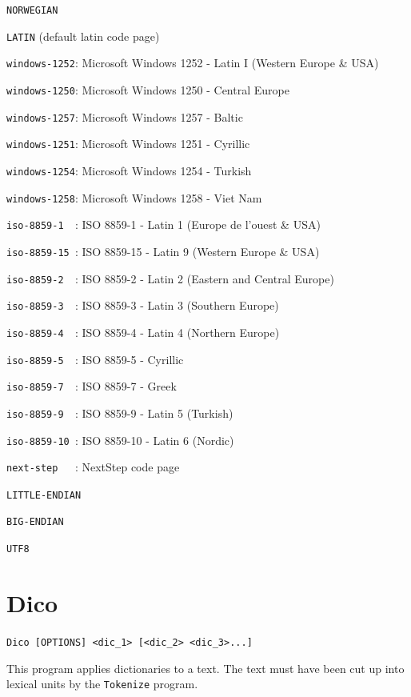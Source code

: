 \verb$NORWEGIAN$

\verb$LATIN$ (default latin code page)

\verb$windows-1252$: Microsoft Windows 1252 - Latin I (Western Europe \& USA)

\verb$windows-1250$: Microsoft Windows 1250 - Central Europe

\verb$windows-1257$: Microsoft Windows 1257 - Baltic

\verb$windows-1251$: Microsoft Windows 1251 - Cyrillic

\verb$windows-1254$: Microsoft Windows 1254 - Turkish

\verb$windows-1258$: Microsoft Windows 1258 - Viet Nam

\verb$iso-8859-1  $: ISO 8859-1  - Latin 1 (Europe de l'ouest \& USA)

\verb$iso-8859-15 $: ISO 8859-15 - Latin 9 (Western Europe \& USA)

\verb$iso-8859-2  $: ISO 8859-2  - Latin 2 (Eastern and Central Europe)

\verb$iso-8859-3  $: ISO 8859-3  - Latin 3 (Southern Europe)

\verb$iso-8859-4  $: ISO 8859-4  - Latin 4 (Northern Europe)

\verb$iso-8859-5  $: ISO 8859-5  - Cyrillic

\verb$iso-8859-7  $: ISO 8859-7  - Greek

\verb$iso-8859-9  $: ISO 8859-9  - Latin 5 (Turkish)

\verb$iso-8859-10 $: ISO 8859-10 - Latin 6 (Nordic)

\verb$next-step   $: NextStep code page

\verb$LITTLE-ENDIAN$

\verb$BIG-ENDIAN$

\verb$UTF8$







\section{Dico}
\verb+Dico [OPTIONS] <dic_1> [<dic_2> <dic_3>...]+

\bigskip
\noindent This program applies dictionaries to a text. The text must have been cut up into
lexical units by the \verb+Tokenize+ program.


